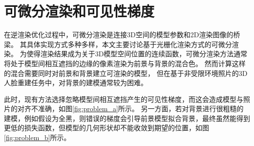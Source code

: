 \section{可微分渲染和可见性梯度}

在逆渲染优化过程中，可微分渲染是连接3D空间的模型参数和2D渲染图像的桥梁。
其具体实现方式多种多样，本文主要讨论基于光栅化渲染方式的可微分渲染。
为使得渲染结果成为关于3D模型空间位置的连续函数，可微分渲染方法通常将处于模型间相互遮挡的边缘的像素渲染为前景与背景的混合色。
然而计算这样的混合需要同时对前景和背景建立可渲染的模型，
但在基于非受限环境照片的3D人脸重建任务中，对背景的建模通常较为困难。

此时，现有方法选择忽略模型间相互遮挡产生的可见性梯度，而这会造成模型与照片的对齐不准确，如图\ref{fig:problem_a}所示。
另一方面，若对背景进行很粗糙的建模，例如假设为全黑，则错误的梯度会引导前景模型拟合背景，最终虽然能得到更低的损失函数，但模型的几何形状却不能收敛到期望的位置，如图\ref{fig:problem_b}所示。

